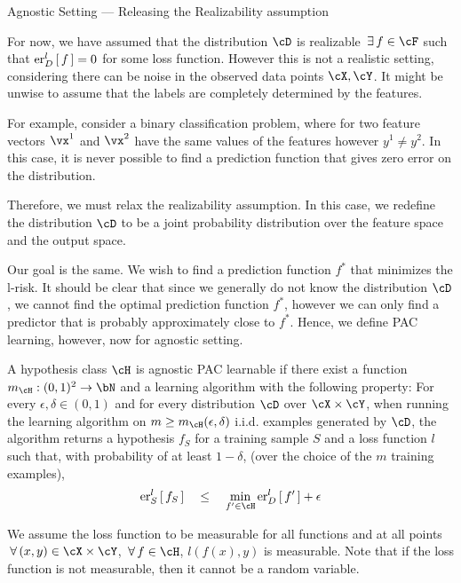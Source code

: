 \documentclass{article}
\begin{document}
\begin{ssection}{Agnostic Setting --- Releasing the Realizability assumption}

	For now, we have assumed that the distribution $\cD$ is realizable  $\qexists f \in \cF$ such that $\err[_D^l]{f} = 0$ for some loss function. However this is not a realistic setting, considering there can be noise in the observed data points $\cX, \cY$. It might be unwise to assume that the labels are completely determined by the features. \br

	For example, consider a binary classification problem, where for two feature vectors $\vx^1$ and $\vx^2$ have the same values of the features however $y^1 \ne y^2$. In this case, it is never possible to find a prediction function that gives zero error on the distribution. \br

	Therefore, we must relax the realizability assumption. In this case, we redefine the distribution $\cD$ to be a joint probability distribution over the feature space and the output space. \br

	Our goal is the same. We wish to find a prediction function $f^\ast$ that minimizes the l-risk. It should be clear that since we generally do not know the distribution $\cD$, we cannot find the optimal prediction function $f^\ast$, however we can only find a predictor that is probably approximately close to $f^\ast$. Hence, we define PAC learning, however, now for agnostic setting. \br

	\begin{definition}
		A hypothesis class $\cH$ is agnostic PAC learnable if there exist a function $m_\cH : (0, 1)^2 \ra \bN$ and a learning algorithm with the following property: For every $\epsilon, \delta \in (0, 1)$ and for every distribution $\cD$ over $\cX \times \cY$, when running the learning algorithm on $m \ge m_\cH (\epsilon, \delta)$ i.i.d. examples generated by $\cD$, the algorithm returns a hypothesis $f_S$ for a training sample $S$ and a loss function $l$ such that, with probability of at least $1 - \delta$, (over the choice of the $m$ training examples),
		\begin{align*}
			\err[_S^l]{f_S}	\qle	\min_{f' \in \cH} \err[_D^l]{f'} + \epsilon
		\end{align*}
	\end{definition}


	\begin{remark}
		We assume the loss function to be measurable for all functions and at all points  $\qforall (x, y) \in \cX \times \cY$, $\qforall f \in \cH$, $l(f(x), y)$ is measurable. Note that if the loss function is not measurable, then it cannot be a random variable.
	\end{remark}
\end{ssection}
\end{document}
